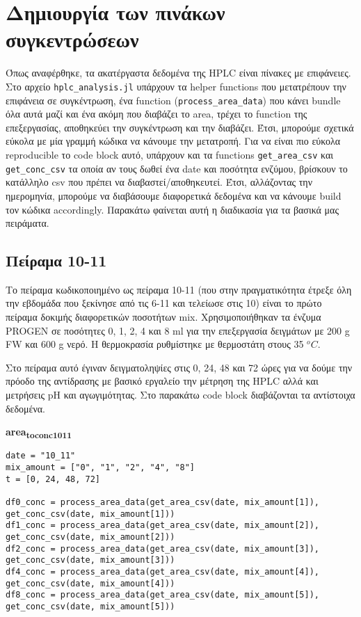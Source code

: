 \documentclass[11pt]{article}
\begin{document}
\section{Δημιουργία των πινάκων συγκεντρώσεων}
\label{sec:orgc329587}
Όπως αναφέρθηκε, τα ακατέργαστα δεδομένα της HPLC είναι πίνακες με επιφάνειες. Στο αρχείο \texttt{hplc\_analysis.jl} υπάρχουν τα helper functions που μετατρέπουν την επιφάνεια σε συγκέντρωση, ένα function (\texttt{process\_area\_data}) που κάνει bundle όλα αυτά μαζί και ένα ακόμη που διαβάζει το area, τρέχει το function της επεξεργασίας, αποθηκεύει την συγκέντρωση και την διαβάζει. Έτσι, μπορούμε σχετικά εύκολα με μία γραμμή κώδικα να κάνουμε την μετατροπή. Για να είναι πιο εύκολα reproducible το code block αυτό, υπάρχουν και τα functions \texttt{get\_area\_csv} και \texttt{get\_conc\_csv} τα οποία αν τους δωθεί ένα date και ποσότητα ενζύμου, βρίσκουν το κατάλληλο csv που πρέπει να διαβαστεί/αποθηκευτεί. Έτσι, αλλάζοντας την ημερομηνία, μπορούμε να διαβάσουμε διαφορετικά δεδομένα και να κάνουμε build τον κώδικα accordingly. Παρακάτω φαίνεται αυτή η διαδικασία για τα βασικά μας πειράματα.

\subsection{Πείραμα 10-11}
\label{sec:org6605812}
Το πείραμα κωδικοποιημένο ως πείραμα 10-11 (που στην πραγματικότητα έτρεξε όλη την εβδομάδα που ξεκίνησε από τις 6-11 και τελείωσε στις 10) είναι το πρώτο πείραμα δοκιμής διαφορετικών ποσοτήτων mix. Χρησιμοποιήθηκαν τα ένζυμα PROGEN σε ποσότητες 0, 1, 2, 4 και 8 ml για την επεξεργασία δειγμάτων με 200 g FW και 600 g νερό. Η θερμοκρασία ρυθμίστηκε με θερμοστάτη στους 35 \(^oC\).

Στο πείραμα αυτό έγιναν δειγματοληψίες στις 0, 24, 48 και 72 ώρες για να δούμε την πρόοδο της αντίδρασης με βασικό εργαλείο την μέτρηση της HPLC αλλά και μετρήσεις pH και αγωγιμότητας. Στο παρακάτω code block διαβάζονται τα αντίστοιχα δεδομένα.

\textbf{area\textsubscript{to}\textsubscript{conc}\textsubscript{10}\textsubscript{11}}
\begin{verbatim}
date = "10_11"
mix_amount = ["0", "1", "2", "4", "8"]
t = [0, 24, 48, 72]

df0_conc = process_area_data(get_area_csv(date, mix_amount[1]), get_conc_csv(date, mix_amount[1]))
df1_conc = process_area_data(get_area_csv(date, mix_amount[2]), get_conc_csv(date, mix_amount[2]))
df2_conc = process_area_data(get_area_csv(date, mix_amount[3]), get_conc_csv(date, mix_amount[3]))
df4_conc = process_area_data(get_area_csv(date, mix_amount[4]), get_conc_csv(date, mix_amount[4]))
df8_conc = process_area_data(get_area_csv(date, mix_amount[5]), get_conc_csv(date, mix_amount[5]))

\end{verbatim}
\end{document}
